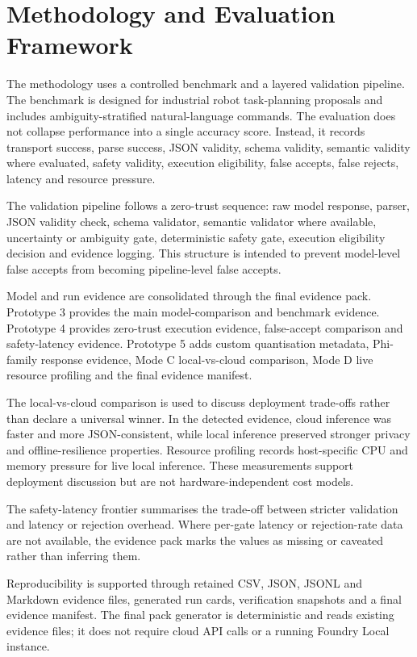 \section{Methodology and Evaluation Framework}
\label{sec:methodology_evaluation_framework}

The methodology uses a controlled benchmark and a layered validation pipeline. The benchmark is designed for industrial robot task-planning proposals and includes ambiguity-stratified natural-language commands. The evaluation does not collapse performance into a single accuracy score. Instead, it records transport success, parse success, JSON validity, schema validity, semantic validity where evaluated, safety validity, execution eligibility, false accepts, false rejects, latency and resource pressure.

The validation pipeline follows a zero-trust sequence: raw model response, parser, JSON validity check, schema validator, semantic validator where available, uncertainty or ambiguity gate, deterministic safety gate, execution eligibility decision and evidence logging. This structure is intended to prevent model-level false accepts from becoming pipeline-level false accepts.

Model and run evidence are consolidated through the final evidence pack. Prototype 3 provides the main model-comparison and benchmark evidence. Prototype 4 provides zero-trust execution evidence, false-accept comparison and safety-latency evidence. Prototype 5 adds custom quantisation metadata, Phi-family response evidence, Mode C local-vs-cloud comparison, Mode D live resource profiling and the final evidence manifest.

The local-vs-cloud comparison is used to discuss deployment trade-offs rather than declare a universal winner. In the detected evidence, cloud inference was faster and more JSON-consistent, while local inference preserved stronger privacy and offline-resilience properties. Resource profiling records host-specific CPU and memory pressure for live local inference. These measurements support deployment discussion but are not hardware-independent cost models.

The safety-latency frontier summarises the trade-off between stricter validation and latency or rejection overhead. Where per-gate latency or rejection-rate data are not available, the evidence pack marks the values as missing or caveated rather than inferring them.

Reproducibility is supported through retained CSV, JSON, JSONL and Markdown evidence files, generated run cards, verification snapshots and a final evidence manifest. The final pack generator is deterministic and reads existing evidence files; it does not require cloud API calls or a running Foundry Local instance.

